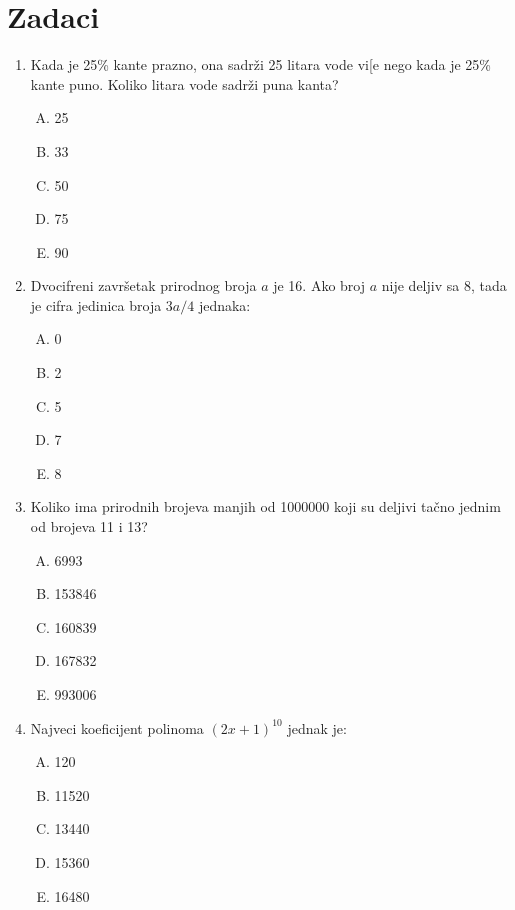 \documentclass[a4paper,12pt]{report}
\begin{document}
\section{Zadaci}

\begin{enumerate}[1.]
\item Kada je 25\% kante prazno, ona sadr\v{z}i 25 litara vode vi[e nego kada je 25\% kante puno. Koliko litara vode sadr\v{z}i puna kanta?
\begin{multicols}{5}
\begin{enumerate}[A)]
\item 25 \item 33 \item 50 \item 75 \item 90
\end{enumerate}
\end{multicols}

\item Dvocifreni zavr\v{s}etak prirodnog broja $a$ je 16. Ako broj $a$ nije deljiv sa 8, tada je cifra jedinica broja $3a/4$ jednaka:
\begin{multicols}{5}
\begin{enumerate}[A)]
\item 0 \item 2 \item 5 \item 7 \item 8
\end{enumerate}
\end{multicols}

\item Koliko ima prirodnih brojeva manjih od 1000000 koji su deljivi ta\v{c}no jednim od brojeva 11 i 13?
\begin{multicols}{5}
\begin{enumerate}[A)]
\item 6993 \item 153846 \item 160839 \item 167832 \item 993006
\end{enumerate}
\end{multicols}

\item Najveci koeficijent polinoma $(2x + 1)^{10} $ jednak je:
\begin{multicols}{5}
\begin{enumerate}[A)]
\item 120 \item 11520 \item 13440 \item 15360 \item 16480
\end{enumerate}
\end{multicols} 


\end{enumerate}
\end{document}
